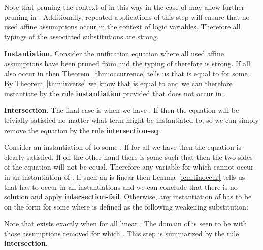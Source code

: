 \documentclass{eptcs}
\theoremstyle{definition}
\begin{document}
Note that pruning the context of  in this way in the case of
 may allow further pruning in .  Additionally, repeated
applications of this step will ensure that no used affine assumptions
occur in the context of logic variables.  Therefore all
typings of the associated substitutions are strong.


\medskip \noindent\textbf{Instantiation.}
Consider the unification equation  where all used affine assumptions have been
pruned from  and the typing of  therefore is strong.
If all  also occur in  then
Theorem~\ref{thm:occurrence} tells us that  is equal to
 for some .  By Theorem~\ref{thm:inverse} we know that
 is equal to  and we can therefore
instantiate  by the rule \textbf{instantiation} provided that 
does not occur in .

\medskip \noindent\textbf{Intersection.}
The final case is when we have .  If  then the
equation will be trivially satisfied no matter what term  might be
instantiated to, so we can simply remove the equation by the rule
\textbf{intersection-eq}.  

Consider an instantiation of  to some .  If for all
 we have  then the equation is
clearly satisfied.  If on the other hand there is some  such
that  then the two sides of the equation
will not be equal.  Therefore any variable  for which
 cannot occur in an instantiation of .
If such an  is linear then Lemma~\ref{lem:linoccur} tells us that
 has to occur in all instantiations and we can conclude that there is
no solution and apply \textbf{intersection-fail}.
Otherwise, any instantiation of  has to be on the form  for some
 where  is defined as the following weakening substitution:

Note that  exists exactly when 
for all linear .  The domain of
 is seen to be  with those assumptions removed for which
.
This step is summarized by the rule \textbf{intersection}.
\end{document}
